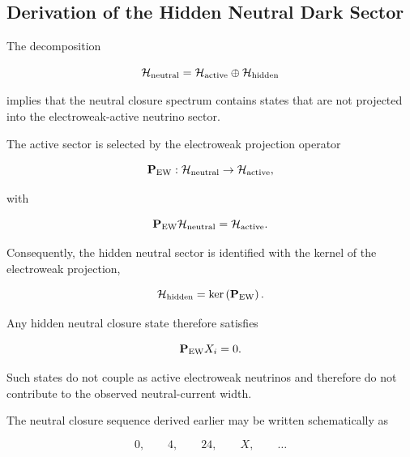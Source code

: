 \documentclass[11pt]{article}
\theoremstyle{definition}
\theoremstyle{remark}
\begin{document}

\subsection{Derivation of the Hidden Neutral Dark Sector}
\label{subsec:hidden_neutral_dark_sector}

The decomposition

\begin{equation}
\mathcal H_{\rm neutral} =
\mathcal H_{\rm active}
\oplus
\mathcal H_{\rm hidden}
\label{eq:Hneutral_decomposition_repeat}
\end{equation}

implies that the neutral closure spectrum contains states that
are not projected into the electroweak-active neutrino sector.

The active sector is selected by the electroweak projection
operator

\begin{equation}
\mathbf P_{\rm EW}
:
\mathcal H_{\rm neutral}
\rightarrow
\mathcal H_{\rm active},
\end{equation}

with

\begin{equation}
\mathbf P_{\rm EW}
\mathcal H_{\rm neutral} =
\mathcal H_{\rm active}.
\end{equation}

Consequently, the hidden neutral sector is identified with the
kernel of the electroweak projection,

\begin{equation}
\mathcal H_{\rm hidden} =
\ker
\left(
\mathbf P_{\rm EW}
\right).
\label{eq:hidden_kernel}
\end{equation}

Any hidden neutral closure state therefore satisfies

\begin{equation}
\mathbf P_{\rm EW}X_i =
0.
\label{eq:hidden_projection_repeat}
\end{equation}

Such states do not couple as active electroweak neutrinos and
therefore do not contribute to the observed neutral-current
width.

The neutral closure sequence derived earlier may be written
schematically as

\begin{equation}
0,
\qquad
4,
\qquad
24,
\qquad
X,
\qquad
\ldots
\label{eq:neutral_sequence_hidden}
\end{equation}
\end{document}
